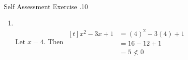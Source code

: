 \documentclass[\main/notes.tex]{subfiles}
\begin{document}
\begin{exercise}{Self Assessment Exercise \thechapter.10}
\begin{enumerate}
\begin{enumerate}[label=(\alph*)]
\begin{proof}
										So, if $n$ is a multiple of $3$, then $n^{3} + n^{2}$ is a multiple of $3$.
									\end{proof}
							\end{enumerate}
						\item {}\\
							Let $x = 4$. Then $ \begin{aligned}[t]
								x^{2} - 3x + 1 &= (4)^{2} - 3(4) + 1\\
								&= 16 - 12 + 1\\
								&= 5 \not < 0
							\end{aligned}$
					\end{enumerate}
				\end{exercise}
				\vspace*{\parskip}
\end{document}
